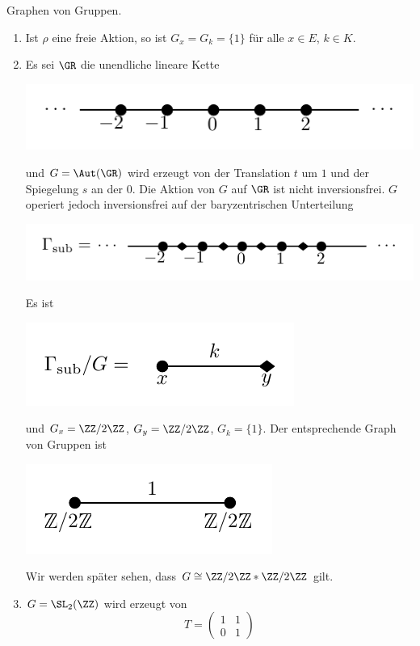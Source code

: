 \BSP Graphen von Gruppen.
\begin{enumerate}
\item Ist $\rho$ eine freie Aktion, so ist $G_x=G_k=\{1\}$ für
alle $x\in E$, $k\in K$.
\item Es sei $\GR$ die unendliche lineare Kette
\begin{center}
	\includegraphics{grugraImages/cay1}
\end{center}
und $G=\Aut(\GR)$ wird erzeugt von der Translation $t$ um $1$ und
der Spiegelung $s$ an der $0$. Die Aktion von $G$ auf $\GR$ ist nicht
inversionsfrei. $G$ operiert jedoch inversionsfrei auf
der baryzentrischen Unterteilung
\begin{center}
	\includegraphics{grugraImages/cay1sub}
\end{center}
Es ist
\begin{center}
	\includegraphics{grugraImages/cay1subquot}
\end{center}
und $G_x=\ZZ/2\ZZ$, $G_y=\ZZ/2\ZZ$, $G_k=\{1\}$.
Der entsprechende Graph von Gruppen ist
\begin{center}
	\includegraphics{grugraImages/GvG1}
\end{center}
Wir werden später sehen, dass $G\cong \ZZ/2\ZZ*\ZZ/2\ZZ$ gilt.
\item $G=\SL_2(\ZZ)$ wird erzeugt von
\[
T=\begin{pmatrix}
1 & 1 \\ 0 & 1

\end{pmatrix}\]
\end{enumerate}
